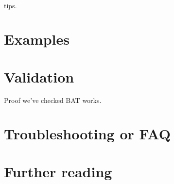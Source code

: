 \documentclass[11pt, a4paper]{article}
\begin{document}
tips.

\section{Examples}

\section{Validation}

Proof we've checked BAT works.

\section{Troubleshooting or FAQ}

\section{Further reading}
\end{document}
